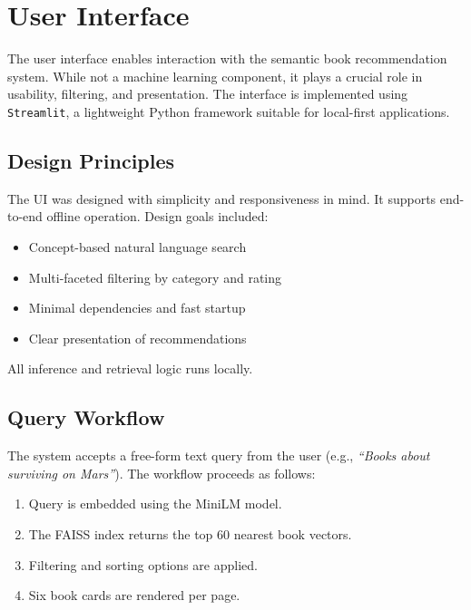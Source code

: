 \chapter{User Interface}
\label{chapter:interface}

The user interface enables interaction with the semantic book recommendation system. 
While not a machine learning component, it plays a crucial role in usability, filtering, and presentation. 
The interface is implemented using \texttt{Streamlit}, a lightweight Python framework suitable for local-first applications.

\section{Design Principles}
\label{sec:ui-design}

The UI was designed with simplicity and responsiveness in mind. It supports end-to-end offline operation. Design goals included:

\begin{itemize}
    \item Concept-based natural language search
    \item Multi-faceted filtering by category and rating
    \item Minimal dependencies and fast startup
    \item Clear presentation of recommendations
\end{itemize}

All inference and retrieval logic runs locally.

\section{Query Workflow}
\label{sec:ui-query-workflow}

The system accepts a free-form text query from the user (e.g., \textit{``Books about surviving on Mars''}). The workflow proceeds as follows:

\begin{enumerate}
    \item Query is embedded using the MiniLM model.
    \item The FAISS index returns the top 60 nearest book vectors.
    \item Filtering and sorting options are applied.
    \item Six book cards are rendered per page.
\end{enumerate}

